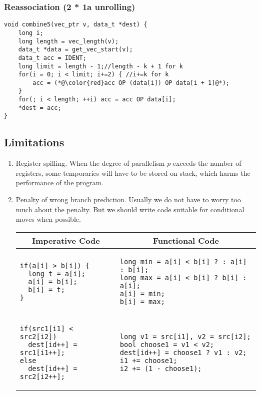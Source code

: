 \subsubsection{Reassociation (2 * 1a unrolling)}
\begin{lstlisting}
void combine5(vec_ptr v, data_t *dest) {
	long i;
	long length = vec_length(v);
	data_t *data = get_vec_start(v);
	data_t acc = IDENT;
	long limit = length - 1;//length - k + 1 for k
	for(i = 0; i < limit; i+=2) { //i+=k for k
		acc = (*@\color{red}acc OP (data[i]) OP data[i + 1]@*);
	}
	for(; i < length; ++i) acc = acc OP data[i]; 
	*dest = acc;
}
\end{lstlisting}
\subsection{Limitations}
\begin{enumerate}
\item Register spilling. When the degree of parallelism $p$ exceeds the number of registers, some temporaries will have to be stored on stack, which harms the performance of the program. 
\item Penalty of wrong branch prediction. Usually we do not have to worry too much about the penalty. But we should write code suitable for conditional moves when possible.
\begin{center}
\begin{tabular}{m{}|m{}}\toprule
\multicolumn{1}{c|}{Imperative Code} & \multicolumn{1}{c}{Functional Code}\\\midrule
\begin{verbatim}
if(a[i] > b[i]) {
  long t = a[i];
  a[i] = b[i];
  b[i] = t;
}
\end{verbatim}
&
\begin{verbatim}
long min = a[i] < b[i] ? : a[i] : b[i];
long max = a[i] < b[i] ? b[i] : a[i];
a[i] = min;
b[i] = max;
\end{verbatim}
\\\midrule
\begin{verbatim}
if(src1[i1] < src2[i2])
  dest[id++] = src1[i1++];
else
  dest[id++] = src2[i2++];
\end{verbatim} 
&
\begin{verbatim}
long v1 = src[i1], v2 = src[i2];
bool choose1 = v1 < v2;
dest[id++] = choose1 ? v1 : v2;
i1 += choose1;
i2 += (1 - choose1);
\end{verbatim}
\\\bottomrule
\end{tabular} 
\end{center}
\end{enumerate}

